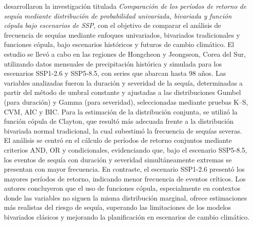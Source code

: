 \textcite{Kim2025} desarrollaron la investigación titulada \emph{Comparación de los períodos de retorno de sequía mediante distribución de probabilidad univariada, bivariada y función cópula bajo escenarios de SSP}, con el objetivo de comparar el análisis de frecuencia de sequías mediante enfoques univariados, bivariados tradicionales y funciones cópula, bajo escenarios históricos y futuros de cambio climático. El estudio se llevó a cabo en las regiones de Hongcheon y Jeongseon, Corea del Sur, utilizando datos mensuales de precipitación histórica y simulada para los escenarios SSP1-2.6 y SSP5-8.5, con series que abarcan hasta 98 años. Las variables analizadas fueron la duración y severidad de la sequía, determinadas a partir del método de umbral constante y ajustadas a las distribuciones Gumbel (para duración) y Gamma (para severidad), seleccionadas mediante pruebas K–S, CVM, AIC y BIC. Para la estimación de la distribución conjunta, se utilizó la función cópula de Clayton, que resultó más adecuada frente a la distribución bivariada normal tradicional, la cual subestimó la frecuencia de sequías severas. El análisis se centró en el cálculo de períodos de retorno conjuntos mediante criterios AND, OR y condicionales, evidenciando que, bajo el escenario SSP5-8.5, los eventos de sequía con duración y severidad simultáneamente extremas se presentan con mayor frecuencia. En contraste, el escenario SSP1-2.6 presentó los mayores períodos de retorno, indicando menor frecuencia de eventos críticos. Los autores concluyeron que el uso de funciones cópula, especialmente en contextos donde las variables no siguen la misma distribución marginal, ofrece estimaciones más realistas del riesgo de sequía, superando las limitaciones de los modelos bivariados clásicos y mejorando la planificación en escenarios de cambio climático.

